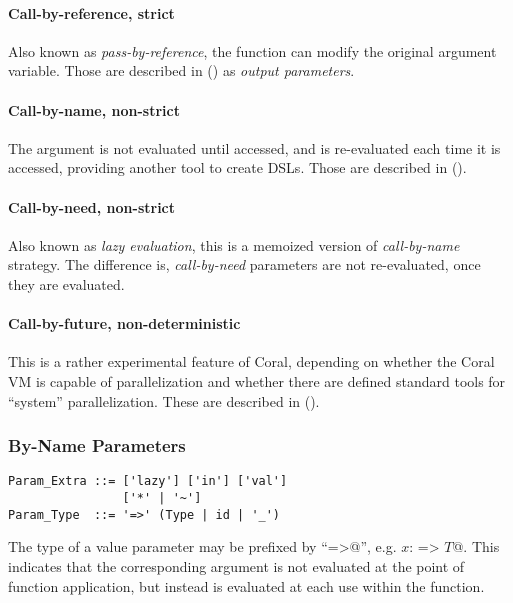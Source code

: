 \paragraph{Call-by-reference, strict}
Also known as {\em pass-by-reference}, the function can modify the original argument variable. Those are described in () as {\em output parameters}. 

\paragraph{Call-by-name, non-strict}
The argument is not evaluated until accessed, and is re-evaluated each time it is accessed, providing another tool to create DSLs. Those are described in (). 

\paragraph{Call-by-need, non-strict}
Also known as {\em lazy evaluation}, this is a memoized version of {\em call-by-name} strategy. The difference is, {\em call-by-need} parameters are not re-evaluated, once they are evaluated. 

\paragraph{Call-by-future, non-deterministic}
This is a rather experimental feature of Coral, depending on whether the Coral VM is capable of parallelization and whether there are defined standard tools for ``system'' parallelization. These are described in ().






\subsubsection{By-Name Parameters}
\label{sec:by-name-parameters}

\syntax\begin{lstlisting}
Param_Extra ::= ['lazy'] ['in'] ['val']
                ['*' | '~']
Param_Type  ::= '=>' (Type | id | '_')
\end{lstlisting}

The type of a value parameter may be prefixed by ``\lstinline@=>@'', e.g. \lstinline@$x$: => $T$@. This indicates that the corresponding argument is not evaluated at the point of function application, but instead is evaluated at each use within the function.


